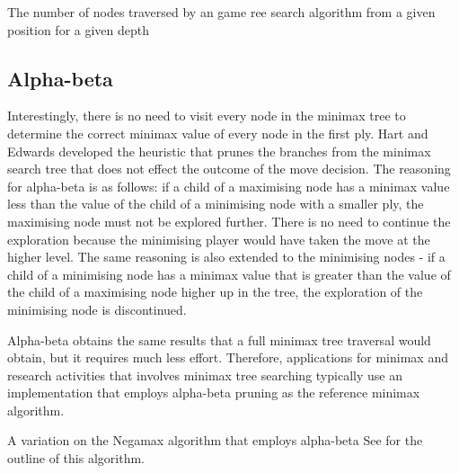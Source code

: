  {The number of nodes traversed by an game ree search algorithm from a given position for a given depth}

\subsection{Alpha-beta}
Interestingly, there is no need to visit every node in the minimax tree to determine the correct minimax value of every node in the first ply.  Hart and Edwards \cite{hart:alpha} developed the  heuristic that prunes the branches from the minimax search tree that does not effect the outcome of the move decision.  The reasoning for alpha-beta is as follows: if a child of a maximising node has a minimax value less than the value of the child of a minimising node with a smaller ply, the maximising node must not be explored further.  There is no need to continue the exploration because the minimising player would have taken the move at the higher level.  The same reasoning is also extended to the minimising nodes - if a child of a minimising node has a minimax value that is greater than the value of the child of a maximising node higher up in the tree, the exploration of the minimising node is discontinued.     

Alpha-beta obtains the same results that a full minimax tree traversal would obtain, but it requires much less effort. Therefore, applications for minimax and research activities that involves minimax tree searching typically use an implementation that employs alpha-beta pruning as the reference minimax algorithm.   

 {A variation on the Negamax algorithm that employs alpha-beta}
See  for the outline of this algorithm.   %

